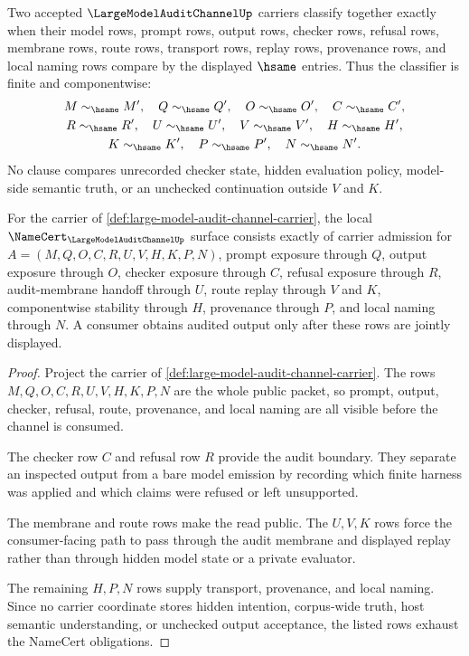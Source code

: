 \begin{definition}
\label{def:large-model-audit-channel-classifier}
Two accepted $\LargeModelAuditChannelUp$ carriers classify together exactly when their model rows, prompt rows, output rows, checker rows, refusal rows, membrane rows, route rows, transport rows, replay rows, provenance rows, and local naming rows compare by the displayed $\hsame$ entries. Thus the classifier is finite and componentwise:
$$
\begin{gathered}
M\sim_{\hsame}M',\quad Q\sim_{\hsame}Q',\quad O\sim_{\hsame}O',\quad C\sim_{\hsame}C',\\
R\sim_{\hsame}R',\quad U\sim_{\hsame}U',\quad V\sim_{\hsame}V',\quad H\sim_{\hsame}H',\\
K\sim_{\hsame}K',\quad P\sim_{\hsame}P',\quad N\sim_{\hsame}N'.
\end{gathered}
$$
No clause compares unrecorded checker state, hidden evaluation policy, model-side semantic truth, or an unchecked continuation outside $V$ and $K$.
\end{definition}

\begin{theorem}
\label{thm:large-model-audit-channel-namecert-obligations}
For the carrier of \autoref{def:large-model-audit-channel-carrier}, the local $\NameCert_{\LargeModelAuditChannelUp}$ surface consists exactly of carrier admission for $A=(M,Q,O,C,R,U,V,H,K,P,N)$, prompt exposure through $Q$, output exposure through $O$, checker exposure through $C$, refusal exposure through $R$, audit-membrane handoff through $U$, route replay through $V$ and $K$, componentwise stability through $H$, provenance through $P$, and local naming through $N$. A consumer obtains audited output only after these rows are jointly displayed.
\end{theorem}
\begin{proof}
Project the carrier of \autoref{def:large-model-audit-channel-carrier}. The rows $M,Q,O,C,R,U,V,H,K,P,N$ are the whole public packet, so prompt, output, checker, refusal, route, provenance, and local naming are all visible before the channel is consumed.

The checker row $C$ and refusal row $R$ provide the audit boundary. They separate an inspected output from a bare model emission by recording which finite harness was applied and which claims were refused or left unsupported.

The membrane and route rows make the read public. The $U,V,K$ rows force the consumer-facing path to pass through the audit membrane and displayed replay rather than through hidden model state or a private evaluator.

The remaining $H,P,N$ rows supply transport, provenance, and local naming. Since no carrier coordinate stores hidden intention, corpus-wide truth, host semantic understanding, or unchecked output acceptance, the listed rows exhaust the NameCert obligations.
\end{proof}

